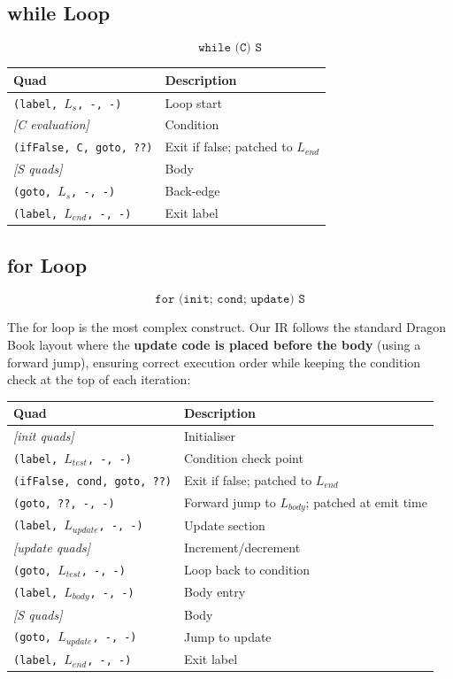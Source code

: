 \documentclass[11pt]{article}
\begin{document}
\subsection{while Loop}

\[
\texttt{while (C) S}
\]

\begin{center}
\renewcommand{\arraystretch}{1.3}
\begin{tabular}{@{}ll@{}}
\toprule
\textbf{Quad} & \textbf{Description} \\
\midrule
\texttt{(label, $L_s$, -, -)} & Loop start \\
\textit{[C evaluation]} & Condition \\
\texttt{(ifFalse, C, goto, ??)} & Exit if false; patched to $L_{end}$ \\
\textit{[S quads]} & Body \\
\texttt{(goto, $L_s$, -, -)} & Back-edge \\
\texttt{(label, $L_{end}$, -, -)} & Exit label \\
\bottomrule
\end{tabular}
\end{center}

\subsection{for Loop}

\[
\texttt{for (init; cond; update) S}
\]

The for loop is the most complex construct. Our IR follows the standard Dragon Book layout where the \textbf{update code is placed before the body} (using a forward jump), ensuring correct execution order while keeping the condition check at the top of each iteration:

\begin{center}
\renewcommand{\arraystretch}{1.3}
\begin{tabular}{@{}ll@{}}
\toprule
\textbf{Quad} & \textbf{Description} \\
\midrule
\textit{[init quads]} & Initialiser \\
\texttt{(label, $L_{test}$, -, -)} & Condition check point \\
\texttt{(ifFalse, cond, goto, ??)} & Exit if false; patched to $L_{end}$ \\
\texttt{(goto, ??, -, -)} & Forward jump to $L_{body}$; patched at emit time \\
\texttt{(label, $L_{update}$, -, -)} & Update section \\
\textit{[update quads]} & Increment/decrement \\
\texttt{(goto, $L_{test}$, -, -)} & Loop back to condition \\
\texttt{(label, $L_{body}$, -, -)} & Body entry \\
\textit{[S quads]} & Body \\
\texttt{(goto, $L_{update}$, -, -)} & Jump to update \\
\texttt{(label, $L_{end}$, -, -)} & Exit label \\
\bottomrule
\end{tabular}
\end{center}
\end{document}
